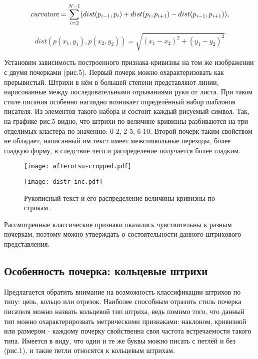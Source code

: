 \documentclass{article}
\begin{document}
\begin{equation}
\emph{curvature} = \sum_{i=2}^{N-1}(dist(p_{i-1}, p_{i}) + dist(p_{i}, p_{i+1}) - dist(p_{i-1}, p_{i+1})),
\end{equation}

\begin{equation}
dist(p(x_1, y_1), p(x_2, y_2)) = \sqrt{(x_1 - x_2)^2 + (y_1 - y_2)^2}
\end{equation}

Установим зависимость построенного признака-кривизны на том же изображении с двумя почерками (рис.5). Первый почерк можно охарактеризовать как прерывистый. Штрихи в нём в большей степени представляют линии, нарисованные между последовательными отрываниями руки от листа. При таком стиле писания особенно наглядно возникает определённый набор шаблонов писателя. Из элементов такого набора и состоит каждый рисуемый символ. Так, на графике рис.5 видно, что штрихи по величине кривизны разбиваются на три отделимых кластера по значению: 0-2, 2-5, 6-10. Второй почерк таким свойством не обладает, написанный им текст имеет межсимвольные переходы, более гладкую форму, в следствие чего и распределение получается более гладким.

\begin{figure}[h]
\begin{minipage}[h]{0.5\linewidth}
    \centering
    \texttt{[image: afterotsu-cropped.pdf]} 
\end{minipage}
\hfill
\begin{minipage}[h]{0.46\linewidth}
    \centering
    \texttt{[image: distr\_inc.pdf]}
\end{minipage}
\caption{Рукописный текст и его распределение величины кривизны по строкам.}
\end{figure}

Рассмотренные классические признаки оказались чувствительны к разным почеркам, поэтому можно утверждать о состоятельности данного штрихового представления.

\subsection{Особенность почерка: кольцевые штрихи}
Предлагается обратить внимание на возможность классификации штрихов по типу: цепь, кольцо или отрезок. Наиболее способным отразить стиль почерка писателя можно назвать кольцевой тип штриха, ведь помимо того, что данный тип можно охарактерирозвать метрическими признаками: наклоном, кривизной или размером - каждому почерку свойственна своя частота встречаемости такого типа. Имеется в виду, что одни и те же буквы можно писать с петлёй и без (рис.1), и такие петли относятся к кольцевым штрихам. 
\end{document}

